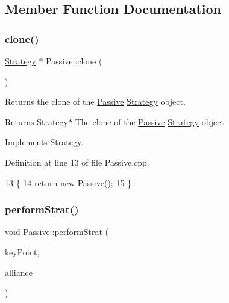 \subsection{Member Function Documentation}
\mbox{\label{classPassive_a576243ca77e794959cfcb33e772856a4}} 
\subsubsection{\texorpdfstring{clone()}{clone()}}
{\footnotesize\ttfamily \hyperlink{classStrategy}{Strategy} $\ast$ Passive\+::clone (\begin{DoxyParamCaption}{ }\end{DoxyParamCaption})\hspace{0.3cm}{\ttfamily [virtual]}}



Returns the clone of the \hyperlink{classPassive}{Passive} \hyperlink{classStrategy}{Strategy} object. 

\begin{DoxyReturn}{Returns}
Strategy$\ast$ The clone of the \hyperlink{classPassive}{Passive} \hyperlink{classStrategy}{Strategy} object 
\end{DoxyReturn}


Implements \hyperlink{classStrategy_aaed20ba057db079ae2bc41b19b009211}{Strategy}.



Definition at line 13 of file Passive.\+cpp.


\begin{DoxyCode}
13                          \{
14     \textcolor{keywordflow}{return} \textcolor{keyword}{new} \hyperlink{classPassive}{Passive}();
15 \}
\end{DoxyCode}
\mbox{\label{classPassive_ab296d4f8ba8ad68dacef1f80e3041aa7}} 
\subsubsection{\texorpdfstring{perform\+Strat()}{performStrat()}}
{\footnotesize\ttfamily void Passive\+::perform\+Strat (\begin{DoxyParamCaption}\item[{Key\+Point $\ast$}]{key\+Point,  }\item[{Alliance $\ast$}]{alliance }\end{DoxyParamCaption})\hspace{0.3cm}{\ttfamily [virtual]}}



